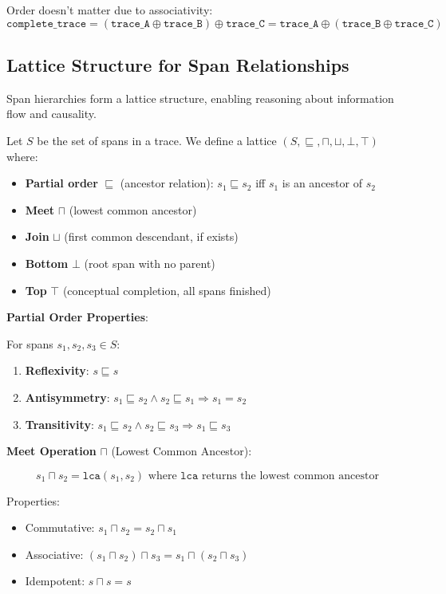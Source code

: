 Order doesn't matter due to associativity:
\[
\texttt{complete\_trace} = (\texttt{trace\_A} \oplus \texttt{trace\_B}) \oplus \texttt{trace\_C} = \texttt{trace\_A} \oplus (\texttt{trace\_B} \oplus \texttt{trace\_C})
\]

\subsection{Lattice Structure for Span Relationships}
\label{sec:lattice}

Span hierarchies form a lattice structure, enabling reasoning about information flow and causality.

\begin{definition}
\label{def:span-lattice}
Let $S$ be the set of spans in a trace. We define a lattice $(S, \sqsubseteq, \sqcap, \sqcup, \bot, \top)$ where:
\begin{itemize}
\item \textbf{Partial order} $\sqsubseteq$ (ancestor relation): $s_1 \sqsubseteq s_2$ iff $s_1$ is an ancestor of $s_2$
\item \textbf{Meet} $\sqcap$ (lowest common ancestor)
\item \textbf{Join} $\sqcup$ (first common descendant, if exists)
\item \textbf{Bottom} $\bot$ (root span with no parent)
\item \textbf{Top} $\top$ (conceptual completion, all spans finished)
\end{itemize}
\end{definition}

\textbf{Partial Order Properties}:

For spans $s_1, s_2, s_3 \in S$:

\begin{enumerate}
\item \textbf{Reflexivity}: $s \sqsubseteq s$
\item \textbf{Antisymmetry}: $s_1 \sqsubseteq s_2 \land s_2 \sqsubseteq s_1 \Rightarrow s_1 = s_2$
\item \textbf{Transitivity}: $s_1 \sqsubseteq s_2 \land s_2 \sqsubseteq s_3 \Rightarrow s_1 \sqsubseteq s_3$
\end{enumerate}

\textbf{Meet Operation} $\sqcap$ (Lowest Common Ancestor):

\[
s_1 \sqcap s_2 = \texttt{lca}(s_1, s_2) \text{ where } \texttt{lca} \text{ returns the lowest common ancestor}
\]

Properties:
\begin{itemize}
\item Commutative: $s_1 \sqcap s_2 = s_2 \sqcap s_1$
\item Associative: $(s_1 \sqcap s_2) \sqcap s_3 = s_1 \sqcap (s_2 \sqcap s_3)$
\item Idempotent: $s \sqcap s = s$
\end{itemize}

